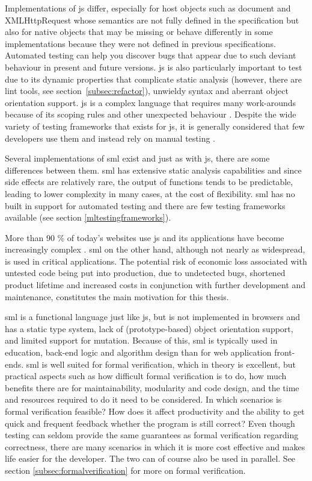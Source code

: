 \documentclass[11pt]{article}
\begin{document}
Implementations of \gls{js} differ, especially for host objects such as document and XMLHttpRequest whose semantics are not fully defined in the specification but also for native objects that may be missing or behave differently in some implementations because they were not defined in previous specifications. Automated testing can help you discover bugs that appear due to such deviant behaviour in present and future versions. \gls{js} is also particularly important to test due to its dynamic properties \cite{AutomatedTesting} that complicate static analysis (however, there are lint tools, see section~\ref{subsec:refactor}), unwieldy syntax and aberrant object orientation support. \gls{js} is a complex language that requires many work-arounds because of its scoping rules and other unexpected behaviour \cite[appendix A]{GoodParts}. Despite the wide variety of testing frameworks that exists for \gls{js}, it is generally considered that few developers use them and instead rely on manual testing \cite{AutomatedTesting}.

Several implementations of \gls{sml} exist and just as with \gls{js}, there are some differences between them. \gls{sml} has extensive static analysis capabilities and since side effects are relatively rare, the output of functions tends to be predictable, leading to lower complexity in many cases, at the cost of flexibility. \gls{sml} has no built in support for automated testing and there are few testing frameworks available (see section \ref{mltestingframeworks}).

More than 90 \% of today's websites use \gls{js} \cite{BusinessJavascript} and its applications have become increasingly complex \cite[question~23]{Ekelof}. \gls{sml} on the other hand, although not nearly as widespread, is used in critical applications. The potential risk of economic loss associated with untested code being put into production, due to undetected bugs, shortened product lifetime and increased costs in conjunction with further development and maintenance, constitutes the main motivation for this thesis.

\Gls{sml} is a functional language just like \gls{js}, but is not implemented in browsers and has a static type system, lack of (prototype-based) object orientation support, and limited support for mutation. Because of this, \gls{sml} is typically used in education, back-end logic and algorithm design than for web application front-ends. \Gls{sml} is well suited for formal verification, which in theory is excellent, but practical aspects such as how difficult formal verification is to do, how much benefits there are for maintainability, modularity and code design, and the time and resources required to do it need to be considered. In which scenarios is formal verification feasible? How does it affect productivity and the ability to get quick and frequent feedback whether the program is still correct? Even though testing can seldom provide the same guarantees as formal verification regarding correctness, there are many scenarios in which it is more cost effective and makes life easier for the developer. The two can of course also be used in parallel. See section \ref{subsec:formalverification} for more on formal verification.
\end{document}
